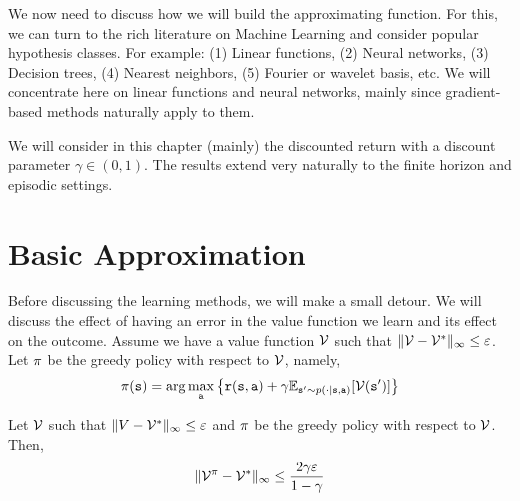 We now need to discuss how we will build the approximating function.
For this, we can turn to the rich literature on Machine Learning and
consider popular hypothesis classes. For example: (1) Linear
functions, (2) Neural networks, (3) Decision trees, (4) Nearest
neighbors, (5) Fourier or wavelet basis, etc. We will concentrate
here on linear functions and neural networks, mainly since gradient-based
methods naturally apply to them.

We will consider in this chapter (mainly) the discounted return with
a discount parameter $\gamma\in(0,1)$. The results extend very
naturally to the finite horizon and episodic settings.


\section{Basic Approximation}

Before discussing the learning methods, we will make a
small detour. We will discuss the effect of having an error in the
value function we learn and its effect on the outcome. Assume we
have a value function $\mathcal{V}$ such that $\|\mathcal{V}-\mathcal{V}^*\|_\infty\leq
\varepsilon$. Let $\pi$ be the greedy policy with respect to
$\mathcal{V}$, namely,
\[
\pi({\tt s})=\arg\max_{\tt a} \left\{{\tt r}({\tt s},{\tt a})+\gamma
\mathbb{E}_{{\tt s}'\sim p(\cdot|{\tt s},{\tt a})}[\mathcal{V}({\tt s}')]\right\}
\]

\begin{theorem}
Let $\mathcal{V}$ such that $\|V-\mathcal{V}^*\|_\infty\leq \varepsilon$ and
$\pi$ be the greedy policy with respect to $\mathcal{V}$. Then,
\[
\|\mathcal{V}^\pi-\mathcal{V}^*\|_\infty\leq\frac{2\gamma\varepsilon}{1-\gamma}
\]
\end{theorem}

